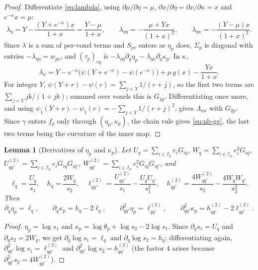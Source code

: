 \documentclass[11pt,a4paper]{article}
\theoremstyle{plain}
\newtheorem{lemma}[proposition]{Lemma}
\theoremstyle{definition}
\newcommand{\E}{\mathcal{I}}
\begin{document}
\begin{proof}
Differentiate \eqref{eq:lambda}, using $\partial\mu/\partial\eta = \mu$, $\partial x/\partial\eta =
\partial x/\partial\kappa = x$ and $e^{-\kappa}x = \mu$:
\[
  \lambda_\eta = Y - \frac{(Y+e^{-\kappa})x}{1+x} = \frac{Y-\mu}{1+x}, \qquad
  \lambda_{\eta\eta} = -\frac{\mu+Yx}{(1+x)^2}, \qquad
  \lambda_{\eta\kappa} = -\frac{(Y-\mu)x}{(1+x)^2}.
\]
Since $\lambda$ is a sum of per-voxel terms and $S_{pv}$ enters as $\eta_p$ does, $\Sigma_p$ is
diagonal with entries $-\lambda_{\eta\eta} = w_{pv}$, and $(\tau_p)_{vq}$ is
$-\lambda_{\eta\eta}\partial_q\eta_p - \lambda_{\eta\kappa}\partial_q\kappa_p$. In $\kappa$,
\[
  \lambda_\kappa = Y - e^{-\kappa}\bigl(\psi(Y+e^{-\kappa}) - \psi(e^{-\kappa})\bigr)
     + \mu\,g(x) - \frac{Yx}{1+x}.
\]
For integer $Y$, $\psi(Y+r) - \psi(r) = \sum_{j<Y} 1/(r+j)$, so the first two terms are
$\sum_{j<Y} jk/(1+jk)$; summed over voxels this is $G_{1p}$. Differentiating once more, and using
$\psi_1(Y+r) - \psi_1(r) = -\sum_{j<Y} 1/(r+j)^2$, gives $\Lambda_{\kappa\kappa}$ with $G_{2p}$.
Since $\gamma$ enters $f_p$ only through $(\eta_p, \kappa_p)$, the chain rule gives
\eqref{eq:nb-gg}, the last two terms being the curvature of the inner map.
\end{proof}

\begin{lemma}[Derivatives of $\eta_p$ and $\kappa_p$]\label{lem:nb-mk-derivs}
Let $U_q = \sum_{i\in\E_p} e_iG_{iq}$, $W_q = \sum_{i\in\E_p} e_i^2G_{iq}$,
$U^{(2)}_{qq'} = \sum_{i\in\E_p} e_iG_{iq}G_{iq'}$,
$W^{(2)}_{qq'} = \sum_{i\in\E_p} e_i^2G_{iq}G_{iq'}$, and
\[
  \ell_q = \frac{U_q}{s_1},\quad
  h_q = \frac{2W_q}{s_2},\quad
  \ell^{(2)}_{qq'} = \frac{U^{(2)}_{qq'}}{s_1} - \frac{U_qU_{q'}}{s_1^2},\quad
  h^{(2)}_{qq'} = \frac{4W^{(2)}_{qq'}}{s_2} - \frac{4W_qW_{q'}}{s_2^2} .
\]
Then
\[
  \partial_q \eta_p = \ell_q, \qquad
  \partial_q \kappa_p = h_q - 2\ell_q, \qquad
  \partial^2_{qq'} \eta_p = \ell^{(2)}_{qq'}, \qquad
  \partial^2_{qq'} \kappa_p = h^{(2)}_{qq'} - 2\ell^{(2)}_{qq'} .
\]
\end{lemma}

\begin{proof}
$\eta_p = \log s_1$ and $\kappa_p = \log\theta_p + \log s_2 - 2\log s_1$. Since
$\partial_q s_1 = U_q$ and $\partial_q s_2 = 2W_q$, we get $\partial_q \log s_1 = \ell_q$ and
$\partial_q \log s_2 = h_q$; differentiating again, $\partial^2_{qq'}\log s_1 = \ell^{(2)}_{qq'}$
and $\partial^2_{qq'} \log s_2 = h^{(2)}_{qq'}$ (the factor $4$ arises because
$\partial^2_{qq'} s_2 = 4W^{(2)}_{qq'}$).
\end{proof}
\end{document}

